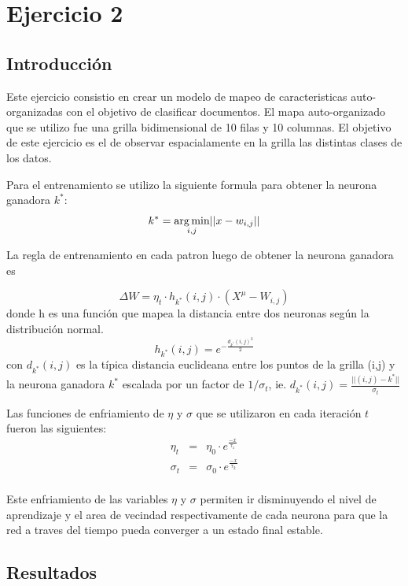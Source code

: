 \section{Ejercicio 2}

\subsection{Introducción}
Este ejercicio consistio en crear un modelo de mapeo de caracteristicas auto-organizadas con el objetivo de clasificar documentos. El mapa
auto-organizado que se utilizo fue una grilla bidimensional de 10 filas y 10 columnas. El objetivo de este ejercicio es el de observar espacialamente
en la grilla las distintas clases de los datos.

Para el entrenamiento se utilizo la siguiente formula para obtener la neurona ganadora $k^*$:
  \[
  k^* = \operatorname*{arg\,min}_{i,j} \lvert\lvert x-w_{i,j} \rvert\rvert
  \]

La regla de entrenamiento en cada patron luego de obtener la neurona ganadora es

\begin{equation}
	\Delta W = \eta_t \cdot h_{k^*}(i,j) \cdot (X^{\mu}-W_{i,j})
\end{equation}
donde h es una función que mapea la distancia entre dos neuronas
según la distribución normal.
\[
	h_{k^*}(i, j) = e^{-\frac{d_{k^*}(i,j)^2}{2}}
\]
con $d_{k^*}(i,j)$ es la típica distancia euclideana entre los puntos de la grilla (i,j) y
la neurona ganadora $k^*$ escalada por un factor de $1/\sigma_t$, ie.
$ d_{k^*}(i,j) = \frac{\lvert \lvert (i,j)-k^* \rvert \rvert}{\sigma_t} $

Las funciones de enfriamiento de $\eta$ y $\sigma$ que se utilizaron
en cada iteración $t$ fueron las siguientes:
\[
  \begin{array}{ccc}
    \eta_t & = & \eta_0 \cdot e^{\frac{-x}{\tau_1}} \\
    \sigma_t & = & \sigma_0 \cdot e^{\frac{-x}{\tau_2}} \\
  \end{array}
\]

Este enfriamiento de las variables $\eta$ y $\sigma$ permiten ir disminuyendo
el nivel de aprendizaje y el area de vecindad respectivamente de cada neurona
para que la red a traves del tiempo pueda converger a un estado final estable.


\subsection{Resultados}
